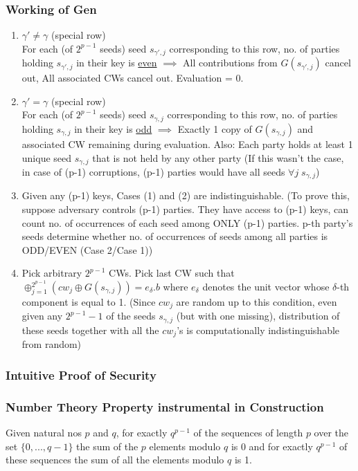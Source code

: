 \subsubsection{Working of Gen}
\begin{enumerate}
    \item $\gamma' \neq \gamma$ (special row) \\
            For each (of $2^{p-1}$ seeds) seed $s_{\gamma', j}$ corresponding to this row, no. of parties holding $s_{\gamma', j}$ in their key is \underline{even} $\implies$ All contributions from $G(s_{\gamma', j})$ cancel out, All associated CWs cancel out. Evaluation = 0.
    \item  $\gamma' = \gamma$ (special row) \\
            For each (of $2^{p-1}$ seeds) seed $s_{\gamma, j}$ corresponding to this row, no. of parties holding $s_{\gamma, j}$ in their key is \underline{odd} $\implies$ Exactly 1 copy of $G(s_{\gamma, j})$ and associated CW remaining during evaluation. Also: Each party holds at least 1 unique seed $s_{\gamma, j}$ that is not held by any other party (If this wasn't the case, in case of (p-1) corruptions, (p-1) parties would have all seeds $\forall j \; s_{\gamma, j}$) 
    \item Given any (p-1) keys, Cases (1) and (2) are indistinguishable. (To prove this, suppose adversary controls (p-1) parties. They have access to (p-1) keys, can count no. of occurrences of each seed among ONLY (p-1) parties. p-th party's seeds determine whether no. of occurrences of seeds among all parties is ODD/EVEN (Case 2/Case 1)) 
    \item Pick arbitrary $2^{p-1}$ CWs. Pick last CW such that $\oplus_{j=1}^{2^{p-1}}(cw_j \oplus G(s_{\gamma, j})) = e_\delta.b$ where $e_\delta$ denotes the unit vector whose $\delta$-th component is equal to 1. (Since $cw_j$ are random up to this condition, even given any $2^{p-1}-1$ of the seeds $s_{\gamma, j}$ (but with one missing), distribution of these seeds together with all the $cw_j$'s is computationally indistinguishable from random)
\end{enumerate}

\subsubsection{Intuitive Proof of Security}

\subsubsection{Number Theory Property instrumental in Construction}
Given natural nos $p$ and $q$, for exactly $q^{p-1}$ of the sequences of length $p$ over the set $\{0, ..., q-1\}$ the sum of the $p$ elements modulo $q$ is 0 and for exactly $q^{p-1}$ of these sequences the sum of all the elements modulo $q$ is 1.

